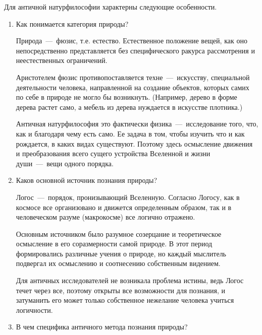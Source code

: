 Для античной натурфилософии характерны следующие особенности. 
\begin{enumerate}
\item Как понимается категория природы?

Природа~---~фюзис, т.е. естество. Естественное положение вещей, как оно непосредственно представляется без специфического ракурса рассмотрения и неестественных ограничений.

Аристотелем фюзис противопоставляется техне~---~искусству, специальной деятельности человека, направленной на создание объектов, которых самих по себе в природе не
могло бы возникнуть. (Например, дерево в форме дерева растет само, а мебель из дерева нуждается в искусстве плотника.)

Античная натурфилософия это фактически физика~---~исследование того, что, как и благодаря чему есть само. Ее задача в том, чтобы изучить что и как рождается, в каких видах существуют. Поэтому здесь осмысление движения и преобразования всего сущего устройства Вселенной и жизни души~---~вещи одного порядка.

\item Каков основной источник познания природы?

Логос~---~порядок, пронизывающий Вселенную. Согласно Логосу, как в космосе все организовано и движется определенным образом, так и в человеческом разуме (макрокосме) все логично отражено.

Основным источником было разумное созерцание и теоретическое осмысление в его соразмерности самой природе. В этот период формировались различные учения о природе, но каждый мыслитель подвергал их осмыслению и соотнесению собственным видением. 


Для античных исследователей не возникала проблема истины, ведь Логос течет через все, поэтому открыты все возможности для познания, и затуманить его может только собственное нежелание человека учиться логичности. 

\item В чем специфика античного метода познания природы? 


\end{enumerate}
